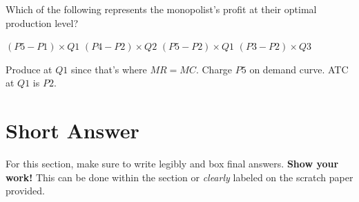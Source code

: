 \documentclass[addpoints,11pt]{exam}
\theoremstyle{definition}
\begin{document}
\begin{questions}
Which of the following represents the monopolist's profit at their optimal production level?

\begin{choices}
\choice $(P5 - P1)\times Q1$
\choice $(P4 - P2)\times Q2$
\CorrectChoice $(P5 - P2)\times Q1$
\choice $(P3 - P2)\times Q3$
\end{choices}

\begin{solution}
Produce at $Q1$ since that's where $MR=MC$. Charge $P5$ on demand curve. ATC at $Q1$ is $P2$.
\end{solution}

\end{questions}	

\section*{Short Answer}

For this section, make sure to write legibly and box final answers. \textbf{Show your work!} This can be done within the section or \textit{clearly} labeled on the scratch paper provided.
\end{document}
